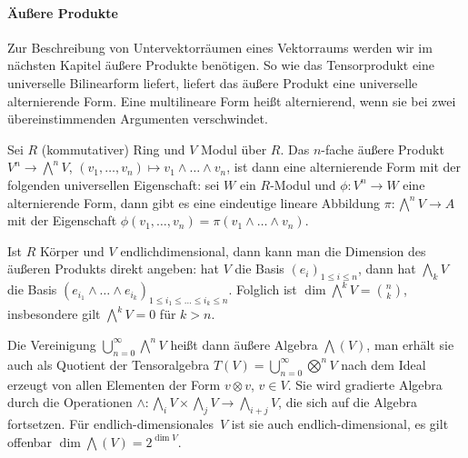 \paragraph{Äußere Produkte} Zur Beschreibung von Untervektorräumen eines Vektorraums werden wir im nächsten Kapitel äußere Produkte benötigen. So wie das Tensorprodukt eine universelle Bilinearform liefert, liefert das äußere Produkt eine universelle alternierende Form. Eine multilineare Form heißt alternierend, wenn sie bei zwei übereinstimmenden Argumenten verschwindet.

\begin{defin}
Sei $R$ (kommutativer) Ring und $V$ Modul über $R$. Das $n$-fache äußere Produkt $V^n \to \bigwedge^n V$, $(v_1, \dots, v_n) \mapsto v_1 \wedge \dots \wedge v_n$, ist dann eine alternierende Form mit der folgenden universellen Eigenschaft: sei $W$ ein $R$-Modul und $\phi: V^n \to W$ eine alternierende Form, dann gibt es eine eindeutige lineare Abbildung $\pi: \bigwedge^n V \to A$ mit der Eigenschaft $\phi(v_1, \dots, v_n) = \pi(v_1 \wedge \dots \wedge v_n)$.
\end{defin}

Ist $R$ Körper und $V$ endlichdimensional, dann kann man die Dimension des äußeren Produkts direkt angeben: hat $V$ die Basis $(e_i)_{1 \leq i \leq n}$, dann hat $\bigwedge_k V$ die Basis $(e_{i_1} \wedge \dots \wedge e_{i_k})_{1 \leq i_1 \leq \dots \leq i_k \leq n}$. Folglich ist $\dim \bigwedge^k V = \binom nk$, insbesondere gilt $\bigwedge^k V = 0$ für $k > n$.

Die Vereinigung $\bigcup_{n=0}^\infty \bigwedge^n V$ heißt dann äußere Algebra $\bigwedge(V)$, man erhält sie auch als Quotient der Tensoralgebra $T(V) = \bigcup_{n=0}^\infty \bigotimes^n V$ nach dem Ideal erzeugt von allen Elementen der Form $v \otimes v$, $v \in V$. Sie wird gradierte Algebra durch die Operationen $\wedge: \bigwedge_i V \times \bigwedge_j V \to \bigwedge_{i+j} V$, die sich auf die Algebra fortsetzen. Für endlich-dimensionales~$V$ ist sie auch endlich-dimensional, es gilt offenbar $\dim \bigwedge(V) = 2^{\dim V}$.
